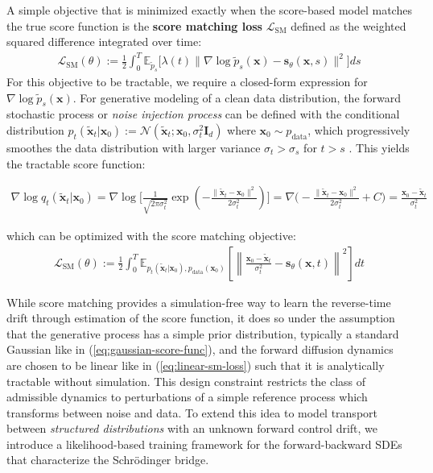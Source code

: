 \documentclass{article}
\newcommand{\boldtext}[1]{\textbf{\textcolor{MyGreen}{#1}}}
\begin{document}
A simple objective that is minimized exactly when the score-based model matches the true score function is the \boldtext{score matching loss} $\mathcal{L}_{\text{SM}}$ \citep{hyvarinen2005estimation, song2021maximum} defined as the weighted squared difference integrated over time:
\begin{align}
    \mathcal{L}_{\text{SM}}(\theta):=\frac{1}{2}\int_0^T\mathbb{E}_{\tilde{p}_s}\big[\lambda(t)\|\nabla \log \tilde{p}_s(\boldsymbol{x})-\boldsymbol{s}_\theta(\boldsymbol{x},s)\|^2\big]ds\tag{Score Maching Loss}\label{eq:score-matching-loss}
\end{align}
For this objective to be tractable, we require a closed-form expression for $\nabla \log \tilde{p}_s(\boldsymbol{x})$. For generative modeling of a clean data distribution, the forward stochastic process or \textit{noise injection process} can be defined with the conditional distribution $p_t(\tilde{\boldsymbol{x}}_t|\boldsymbol{x}_0):=\mathcal{N}(\tilde{\boldsymbol{x}}_t;\boldsymbol{x}_0, \sigma^2_t\boldsymbol{I}_d)$ where $\boldsymbol{x}_0\sim p_{\text{data}}$, which progressively smoothes the data distribution with larger variance $\sigma_t>\sigma_s$ for $t> s$ \citep{song2019generative}. This yields the tractable score function:
\begin{small}
\begin{align}
    \nabla\log q_t(\tilde{\boldsymbol{x}}_t|\boldsymbol{x}_0)=\nabla\log \bigg[\frac{1}{\sqrt{2\pi\sigma_t^2}}\exp\left(-\frac{\|\tilde{\boldsymbol{x}}_t-\boldsymbol{x}_0\|^2}{2\sigma_t^2}\right)\bigg]=\nabla\bigg(-\frac{\|\tilde{\boldsymbol{x}}_t-\boldsymbol{x}_0\|^2}{2\sigma_t^2}+C\bigg)=\boxed{\frac{\boldsymbol{x}_0-\tilde{\boldsymbol{x}}_t}{\sigma_t^2}}\label{eq:gaussian-score-func}
\end{align}
\end{small}
which can be optimized with the score matching objective:
\begin{align}
    \mathcal{L}_{\text{SM}}(\theta):=\frac{1}{2}\int_0^T\mathbb{E}_{p_t(\tilde{\boldsymbol{x}}_t|\boldsymbol{x}_0), p_{\text{data}}(\boldsymbol{x}_0)}\left[\left\|\frac{\boldsymbol{x}_0-\tilde{\boldsymbol{x}}_t}{\sigma_t^2}-\boldsymbol{s}_\theta(\boldsymbol{x},t)\right\|^2\right]dt\label{eq:linear-sm-loss}
\end{align}

While score matching provides a simulation-free way to learn the reverse-time drift through estimation of the score function, it does so under the assumption that the generative process has a simple prior distribution, typically a standard Gaussian like in (\ref{eq:gaussian-score-func}), and the forward diffusion dynamics are chosen to be linear like in (\ref{eq:linear-sm-loss}) such that it is analytically tractable without simulation. This design constraint restricts the class of admissible dynamics to perturbations of a simple reference process which transforms between noise and data. To extend this idea to model transport between \textit{structured distributions} with an unknown forward control drift, we introduce a likelihood-based training framework for the forward-backward SDEs that characterize the Schrödinger bridge.
\end{document}
